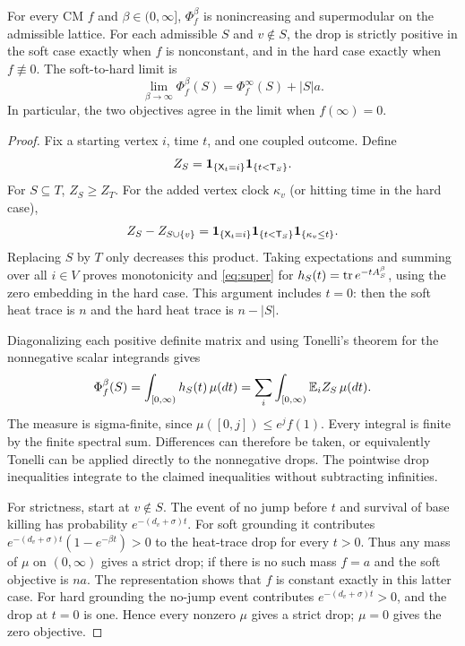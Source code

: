 \begin{theorem}\label{thm:cm}
For every CM $f$ and $\beta\in(0,\infty]$, $\Phi_f^\beta$ is
nonincreasing and supermodular on the admissible lattice.
For each admissible $S$ and $v\notin S$, the drop is strictly positive
in the soft case exactly when $f$ is nonconstant, and in the hard case
exactly when $f\not\equiv0$.
The soft-to-hard limit is
\begin{equation}\label{eq:hardlimit}
 \lim_{\beta\to\infty}\Phi_f^\beta(S)
 =\Phi_f^\infty(S)+|S|a.
\end{equation}
In particular, the two objectives agree in the limit when $f(\infty)=0$.
\end{theorem}
\begin{proof}
Fix a starting vertex $i$, time $t$, and one coupled outcome. Define
\[
 Z_S=\mathbf 1_{\{\mathsf X_t=i\}}\mathbf 1_{\{t<\mathsf T_S\}}.
\]
For $S\subseteq T$, $Z_S\geq Z_T$. For the added vertex clock
$\kappa_v$ (or hitting time in the hard case),
\[
 Z_S-Z_{S\cup\{v\}}
 =\mathbf 1_{\{\mathsf X_t=i\}}\mathbf 1_{\{t<\mathsf T_S\}}\mathbf 1_{\{\kappa_v\leq t\}}.
\]
Replacing $S$ by $T$ only decreases this product. Taking expectations
and summing over all $i\in V$ proves monotonicity and
\eqref{eq:super} for $h_S(t)=\operatorname{tr} e^{-tA_S^\beta}$, using the zero
embedding in the hard case. This argument includes $t=0$: then the
soft heat trace is $n$ and the hard heat trace is $n-|S|$.

Diagonalizing each positive definite matrix and using Tonelli's theorem
for the nonnegative scalar integrands gives
\[
 \Phi_f^\beta(S)=\int_{[0,\infty)}h_S(t)\,\mu(dt)
 =\sum_i\int_{[0,\infty)}\mathbb E_i Z_S\,\mu(dt).
\]
The measure is sigma-finite, since $\mu([0,j])\leq e^j f(1)$.
Every integral is finite by the finite spectral sum. Differences can
therefore be taken, or equivalently Tonelli can be applied directly
to the nonnegative drops. The pointwise drop inequalities integrate
to the claimed inequalities without subtracting infinities.

For strictness, start at $v\notin S$. The event of no jump before $t$
and survival of base killing has probability $e^{-(d_v+\sigma)t}$.
For soft grounding it contributes
$e^{-(d_v+\sigma)t}(1-e^{-\beta t})>0$ to the heat-trace drop for
every $t>0$. Thus any mass of $\mu$ on $(0,\infty)$ gives a strict drop;
if there is no such mass $f=a$ and the soft objective is $na$.
The representation shows that $f$ is constant exactly in this latter
case. For hard grounding the no-jump event contributes
$e^{-(d_v+\sigma)t}>0$, and the drop at $t=0$ is one. Hence every
nonzero $\mu$ gives a strict drop; $\mu=0$ gives the zero objective.


\end{proof}
